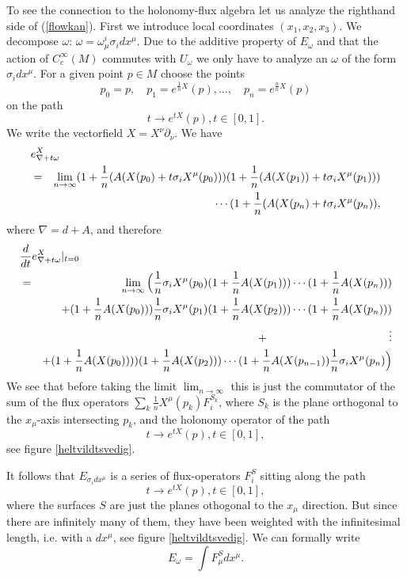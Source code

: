 \documentclass[12pt]{article}
\newcommand{\nn}{\nonumber}
\def\m{\mu}
\def\n{\nu}
\begin{document}
To see the connection to the holonomy-flux algebra let us analyze the righthand side of (\ref{flowkan}). First we introduce local coordinates $(x_1 ,x_2,x_3)$. We decompose $\omega$: $\omega =\omega^i_\m\sigma_i dx^\m$. Due to the additive property of $E_\omega$ and that the action of $C^\infty_c(M)$ commutes with $U_{\omega }$ we only have to analyze an $\omega $ of the form $\sigma_i dx^\m$. For a given point $p\in M$ choose the points $$p_0=p,\quad p_1=e^{\frac{1}{n}X}(p),\ldots  ,\quad  p_n= e^{\frac{n}{n}X}(p)$$ 
on the path
$$t\to e^{tX}(p)  ,t\in [0,1].$$
We write the vectorfield $X=X^\n\partial_\n$. 
We have 
\begin{eqnarray} 
\lefteqn{e^X_{\nabla+t\omega}}\nn\\
& =&\lim_{n\to \infty } (1+\frac{1}{n}(A(X(p_0)+t\sigma_i X^\m(p_0) )) (1+\frac{1}{n}(A(X(p_1))+t\sigma_iX^\m(p_1)))\nn\\
&& \cdots (1+\frac{1}{n}(A(X(p_n)+t\sigma_i X^\m(p_n)) ,
\label{vlad}
\end{eqnarray}
where  $\nabla=d+A$, and therefore 
\begin{eqnarray}
 \lefteqn{\frac{d}{dt}e^X_{\nabla +t\omega}|_{t=0}}
 \nn
 \\
 &=& \lim_{n\to \infty }  \Big( \frac{1}{n} \sigma_iX^\m(p_0)  (1+\frac{1}{n}A(X(p_1)))\cdots (1+\frac{1}{n}A(X(p_n))) \nn\\
 &&+ (1+\frac{1}{n}A(X(p_0))) \frac{1}{n} \sigma_iX^\m(p_1)  (1+\frac{1}{n}A(X(p_2)))\cdots (1+\frac{1}{n}A(X(p_n))) \nn\\
 && + \quad\quad\quad\quad\quad\quad\quad\quad\quad\quad\quad \vdots \nn\\
 &&+ (1+\frac{1}{n}A(X(p_0))) )  (1+\frac{1}{n}A(X(p_2)))\cdots (1+\frac{1}{n}A(X(p_{n-1})) \frac{1}{n} \sigma_i X^\m(p_n) \Big)
\nn\\ \label{COOM}
\end{eqnarray}
We see that before taking the limit $\lim_{n\to \infty}$ this is just the commutator of the sum of the flux operators $\sum_k \frac{1}{n}X^\m (p_k) F^{S_k}_i $, where $S_k$ is the plane orthogonal to the $x_\m$-axis intersecting $p_k$, and the holonomy operator of the path $$t\to e^{tX}(p)  ,t\in [0,1],$$
 see figure \ref{heltvildtsvedig}.
 
It follows that $E_{\sigma_i dx^\m}$ is  a series of flux-operators $F^S_i$ sitting along the path $$t\to e^{tX}(p)  ,t\in [0,1],$$
where the surfaces $S$ are just the planes othogonal to the $x_\m$ direction.
But since there are infinitely many of them, they have been weighted with the infinitesimal length, i.e. with a $dx^\m$, see figure \ref{heltvildtsvedig}. We can formally write 
$$E_\omega = \int F^S_\m dx^\m  . $$   
\end{document}
